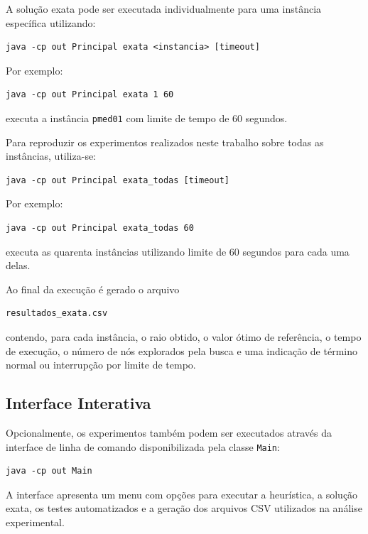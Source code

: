 \documentclass[12pt]{article}
\begin{document}
A solução exata pode ser executada individualmente para uma instância específica utilizando:

\begin{verbatim}
java -cp out Principal exata <instancia> [timeout]
\end{verbatim}

Por exemplo:

\begin{verbatim}
java -cp out Principal exata 1 60
\end{verbatim}

executa a instância \texttt{pmed01} com limite de tempo de 60 segundos.

Para reproduzir os experimentos realizados neste trabalho sobre todas as instâncias, utiliza-se:

\begin{verbatim}
java -cp out Principal exata_todas [timeout]
\end{verbatim}

Por exemplo:

\begin{verbatim}
java -cp out Principal exata_todas 60
\end{verbatim}

executa as quarenta instâncias utilizando limite de 60 segundos para cada uma delas.

Ao final da execução é gerado o arquivo

\begin{verbatim}
resultados_exata.csv
\end{verbatim}

contendo, para cada instância, o raio obtido, o valor ótimo de referência, o tempo de execução, o número de nós explorados pela busca e uma indicação de término normal ou interrupção por limite de tempo.

\subsection{Interface Interativa}

Opcionalmente, os experimentos também podem ser executados através da interface de linha de comando disponibilizada pela classe \texttt{Main}:

\begin{verbatim}
java -cp out Main
\end{verbatim}

A interface apresenta um menu com opções para executar a heurística, a solução exata, os testes automatizados e a geração dos arquivos CSV utilizados na análise experimental.
\end{document}
